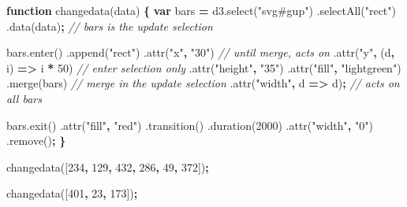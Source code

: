 \documentclass[openany]{book}
\newenvironment{Shaded}{\begin{snugshade}}{\end{snugshade}}
\newcommand{\AttributeTok}[1]{\textcolor[rgb]{0.77,0.63,0.00}{#1}}
\newcommand{\CommentTok}[1]{\textcolor[rgb]{0.56,0.35,0.01}{\textit{#1}}}
\newcommand{\DecValTok}[1]{\textcolor[rgb]{0.00,0.00,0.81}{#1}}
\newcommand{\KeywordTok}[1]{\textcolor[rgb]{0.13,0.29,0.53}{\textbf{#1}}}
\newcommand{\NormalTok}[1]{#1}
\newcommand{\OperatorTok}[1]{\textcolor[rgb]{0.81,0.36,0.00}{\textbf{#1}}}
\newcommand{\StringTok}[1]{\textcolor[rgb]{0.31,0.60,0.02}{#1}}
\newcommand{\VariableTok}[1]{\textcolor[rgb]{0.00,0.00,0.00}{#1}}
\begin{document}
\begin{Shaded}
\begin{Highlighting}[]
\KeywordTok{function} \AttributeTok{changedata}\NormalTok{(data) }\OperatorTok{\{}
  \KeywordTok{var}\NormalTok{ bars }\OperatorTok{=} \VariableTok{d3}\NormalTok{.}\AttributeTok{select}\NormalTok{(}\StringTok{"svg#gup"}\NormalTok{) }
\NormalTok{    .}\AttributeTok{selectAll}\NormalTok{(}\StringTok{"rect"}\NormalTok{)}
\NormalTok{    .}\AttributeTok{data}\NormalTok{(data)}\OperatorTok{;}    \CommentTok{// bars is the update selection}
    
  \VariableTok{bars}\NormalTok{.}\AttributeTok{enter}\NormalTok{()}
\NormalTok{    .}\AttributeTok{append}\NormalTok{(}\StringTok{"rect"}\NormalTok{)}
\NormalTok{      .}\AttributeTok{attr}\NormalTok{(}\StringTok{"x"}\OperatorTok{,} \StringTok{"30"}\NormalTok{)  }\CommentTok{// until merge, acts on}
\NormalTok{      .}\AttributeTok{attr}\NormalTok{(}\StringTok{"y"}\OperatorTok{,}\NormalTok{ (d}\OperatorTok{,}\NormalTok{ i) }\OperatorTok{=>}\NormalTok{ i }\OperatorTok{*} \DecValTok{50}\NormalTok{) }\CommentTok{// enter selection only}
\NormalTok{      .}\AttributeTok{attr}\NormalTok{(}\StringTok{"height"}\OperatorTok{,} \StringTok{"35"}\NormalTok{)  }
\NormalTok{      .}\AttributeTok{attr}\NormalTok{(}\StringTok{"fill"}\OperatorTok{,} \StringTok{"lightgreen"}\NormalTok{)}
\NormalTok{    .}\AttributeTok{merge}\NormalTok{(bars) }\CommentTok{// merge in the update selection}
\NormalTok{      .}\AttributeTok{attr}\NormalTok{(}\StringTok{"width"}\OperatorTok{,}\NormalTok{ d }\OperatorTok{=>}\NormalTok{ d)}\OperatorTok{;} \CommentTok{// acts on all bars}
      
  \VariableTok{bars}\NormalTok{.}\AttributeTok{exit}\NormalTok{()}
\NormalTok{    .}\AttributeTok{attr}\NormalTok{(}\StringTok{"fill"}\OperatorTok{,} \StringTok{"red"}\NormalTok{)}
\NormalTok{    .}\AttributeTok{transition}\NormalTok{()}
\NormalTok{    .}\AttributeTok{duration}\NormalTok{(}\DecValTok{2000}\NormalTok{)}
\NormalTok{    .}\AttributeTok{attr}\NormalTok{(}\StringTok{"width"}\OperatorTok{,} \StringTok{"0"}\NormalTok{)}
\NormalTok{    .}\AttributeTok{remove}\NormalTok{()}\OperatorTok{;}
  \OperatorTok{\}}
\end{Highlighting}
\end{Shaded}

\begin{Shaded}
\begin{Highlighting}[]
\AttributeTok{changedata}\NormalTok{([}\DecValTok{234}\OperatorTok{,} \DecValTok{129}\OperatorTok{,} \DecValTok{432}\OperatorTok{,} \DecValTok{286}\OperatorTok{,} \DecValTok{49}\OperatorTok{,} \DecValTok{372}\NormalTok{])}\OperatorTok{;}

\AttributeTok{changedata}\NormalTok{([}\DecValTok{401}\OperatorTok{,} \DecValTok{23}\OperatorTok{,} \DecValTok{173}\NormalTok{])}\OperatorTok{;}
\end{Highlighting}
\end{Shaded}
\end{document}

